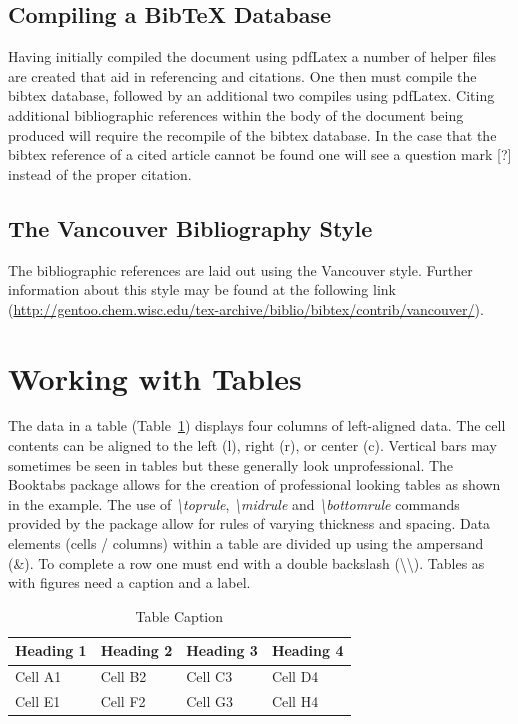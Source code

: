 \subsection{Compiling a BibTeX Database}

Having initially compiled the document using pdfLatex a number of helper files are created that aid in referencing and citations. One then must compile the bibtex database, followed by an additional two compiles using pdfLatex. Citing additional bibliographic references within the body of the document being produced will require the recompile of the bibtex database. In the case that the bibtex reference of a cited article cannot be found one will see a question mark [?] instead of the proper citation.

\subsection{The Vancouver Bibliography Style}

The bibliographic references are laid out using the Vancouver style. Further information about this style may be found at the following link (\url{http://gentoo.chem.wisc.edu/tex-archive/biblio/bibtex/contrib/vancouver/}).


\section{Working with Tables}

The data in a table (Table~\ref{tab:using:TableExample}) displays four columns of left-aligned data. The cell contents can be aligned to the left (l), right (r), or center (c). Vertical bars may sometimes be seen in tables but these generally look unprofessional. The Booktabs package \cite{web:Fear2005BookTabs} allows for the creation of professional looking tables as shown in the example.  The use of \emph{\textbackslash toprule}, \emph{\textbackslash midrule} and \emph{\textbackslash bottomrule} commands provided by the package allow for rules of varying thickness and spacing. Data elements (cells / columns) within a table are divided up using the ampersand (\&). To complete a row one must end with a double backslash (\textbackslash\textbackslash). Tables as with figures need a caption and a label.

\begin{table}[H]
\centering
\small
\begin{tabular}{llll}
\toprule \textbf{Heading 1}& \textbf{Heading 2}&\textbf{Heading 3}&\textbf{Heading 4}\\
\midrule
Cell A1 & Cell B2 & Cell C3 & Cell D4\\
Cell E1 & Cell F2 & Cell G3 & Cell H4\\
\bottomrule
\end{tabular}
\caption{Table Caption}\label{tab:using:TableExample}
\end{table}



